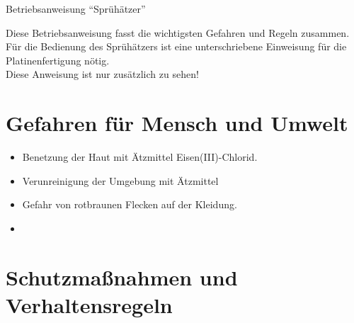 \documentclass[fontsize=9pt]{scrartcl}
\newenvironment{smallitemize}{\begin{itemize}\itemsep -3pt}{\end{itemize}}
\begin{document}

\begin{center}
	\LARGE{Betriebsanweisung \enquote{Sprühätzer}}
\end{center}


\begin{center}
	Diese Betriebsanweisung fasst die wichtigsten Gefahren und Regeln zusammen.\\
	Für die Bedienung des Sprühätzers ist eine unterschriebene Einweisung für die Platinenfertigung nötig.\\
	Diese Anweisung ist nur zusätzlich zu sehen!\\
\end{center}

\section{Gefahren für Mensch und Umwelt}

\begin{smallitemize}
	\item Benetzung der Haut mit Ätzmittel Eisen(III)-Chlorid.
	\item Verunreinigung der Umgebung mit Ätzmittel
	\item Gefahr von rotbraunen Flecken auf der Kleidung.
	\item 
\end{smallitemize}

\section{Schutzmaßnahmen und Verhaltensregeln}
\end{document}

